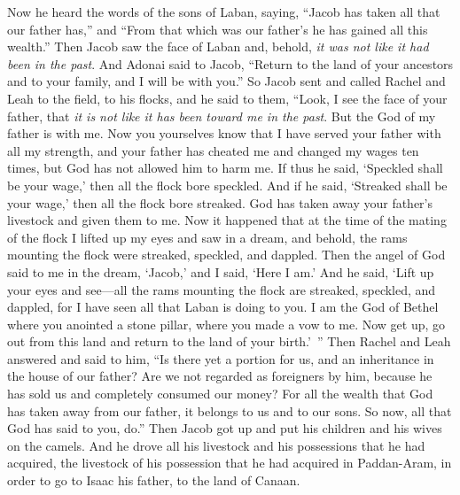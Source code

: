 \begin{biblechapter} %
 Now he heard the words of the sons of Laban, saying, “Jacob has taken all that our father has,” and “From that which was our father’s he has gained all this wealth.”
\verse Then Jacob saw the face of Laban and, behold, \textit{it was not like it had been in the past}.
\verse And Adonai said to Jacob, “Return to the land of your ancestors and to your family, and I will be with you.”
\verse So Jacob sent and called Rachel and Leah to the field, to his flocks,
\verse and he said to them, “Look, I see the face of your father, that \textit{it is not like it has been toward me in the past}. But the God of my father is with me.
\verse Now you yourselves know that I have served your father with all my strength,
\verse and your father has cheated me and changed my wages ten times, but God has not allowed him to harm me.
\verse If thus he said, ‘Speckled shall be your wage,’ then all the flock bore speckled. And if he said, ‘Streaked shall be your wage,’ then all the flock bore streaked.
\verse God has taken away your father’s livestock and given them to me.
\verse Now it happened that at the time of the mating of the flock I lifted up my eyes and saw in a dream, and behold, the rams mounting the flock were streaked, speckled, and dappled.
\verse Then the angel of God said to me in the dream, ‘Jacob,’ and I said, ‘Here I am.’
\verse And he said, ‘Lift up your eyes and see—all the rams mounting the flock are streaked, speckled, and dappled, for I have seen all that Laban is doing to you.
\verse I am the God of Bethel where you anointed a stone pillar, where you made a vow to me. Now get up, go out from this land and return to the land of your birth.’ ”
\verse Then Rachel and Leah answered and said to him, “Is there yet a portion for us, and an inheritance in the house of our father?
\verse Are we not regarded as foreigners by him, because he has sold us and completely consumed our money?
\verse For all the wealth that God has taken away from our father, it belongs to us and to our sons. So now, all that God has said to you, do.”
\verse Then Jacob got up and put his children and his wives on the camels.
\verse And he drove all his livestock and his possessions that he had acquired, the livestock of his possession that he had acquired in Paddan-Aram, in order to go to Isaac his father, to the land of Canaan.

\end{biblechapter}
